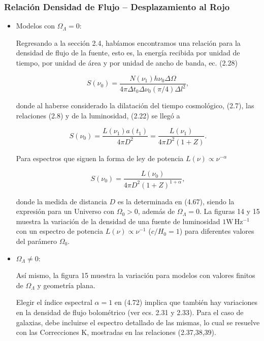 \documentclass[11pt]{article}
\begin{document}
{    
    \subsubsection{Relación Densidad de Flujo – Desplazamiento al Rojo}

\begin{itemize} 

\item Modelos con $\Omega_{\Lambda} =0$:

Regresando a la sección 2.4,  habíamos encontramos una relación para la densidad de flujo de la fuente, esto es, la energía recibida por unidad de tiempo, por unidad de área y por unidad de ancho de banda, ec. (2.28)

\begin{equation}
	S(\nu_0) = \frac{N(\nu_1)h \nu_0 \Delta \Omega}{4 \pi \Delta t_0 \Delta \nu_0 (\pi/4) \Delta l^2},
\end{equation}

donde al haberse considerado la dilatación del tiempo cosmológico,  (2.7), las relaciones (2.8) y de la luminosidad, (2.22) se llegó a 

\begin{equation}
	S(\nu_0) = \frac{L(\nu_1) a(t_1)}{4 \pi D^2} = \frac{L(\nu_1) }{4 \pi D^2(1+Z)}.
\end{equation}

Para espectros que siguen la forma de ley de potencia $L(\nu) \propto \nu^{-\alpha}$ 

\begin{equation}
	S(\nu_0) = \frac{L(\nu_0) }{4 \pi D^2(1+Z)^{1+\alpha}},
\end{equation}


donde la medida de distancia $D$ es la determinada en (4.67), siendo la expresión para un Universo con $\Omega_0 > 0$, además de $\Omega_{\Lambda} =0$. La figuras 14 y 15 muestra la variación de la densidad de una fuente de luminosidad $1 \mathrm{W \, Hz^{-1}}$ con un espectro de potencia $L(\nu) \propto \nu^{-1}$ ($c/H_0 =1$)  para diferentes valores del parámero $\Omega_0$. 



\item $\Omega_{\Lambda} \neq 0$:

Así mismo, la figura 15 muestra la variación para modelos con valores finitos de $\Omega_{\Lambda}$ y geometría plana. 

Elegir el índice espectral $\alpha = 1$  en (4.72) implica que también hay variaciones en la densidad de flujo bolométrico (ver ecs. 2.31 y 2.33). Para el caso de galaxias, debe incluirse el espectro detallado de las mismas, lo cual se resuelve con las Correcciones K, mostradas en las relaciones (2.37,38,39). 


\end{itemize}}
\end{document}
